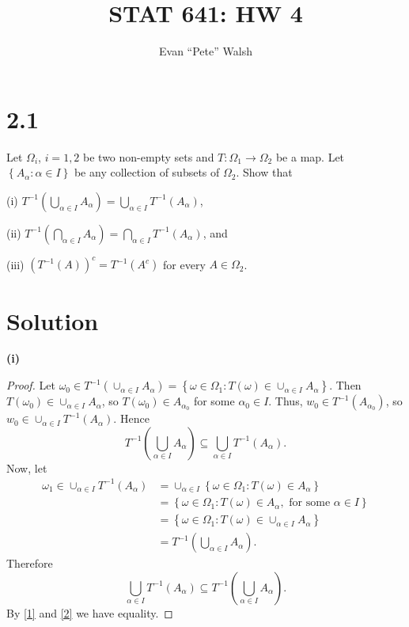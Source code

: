 \documentclass[12pt]{article}
\title{STAT 641: HW 4}
\author{Evan ``Pete'' Walsh}
\begin{document}
\maketitle

\section*{2.1}
Let $\Omega_{i}$, $i = 1,2$ be two non-empty sets and $T : \Omega_{1} \rightarrow \Omega_{2}$ be a map. Let $\left\{ A_{\alpha} : \alpha \in I
\right\}$ be any collection of subsets of $\Omega_{2}$. Show that

(i) $T^{-1}\left( \bigcup_{\alpha \in I}A_{\alpha} \right) = \bigcup_{\alpha\in I}T^{-1}(A_{\alpha})$,

(ii) $T^{-1}\left( \bigcap_{\alpha \in I} A_\alpha \right) = \bigcap_{\alpha \in I}T^{-1}(A_\alpha)$, and 

(iii) $\left( T^{-1}(A) \right)^{c} = T^{-1}(A^{c})$ for every $A \in \Omega_2$.

\section*{Solution}

{\bf (i)}
\begin{proof}
Let $\omega_0 \in T^{-1}(\cup_{\alpha \in I}A_{\alpha}) = \left\{ \omega \in \Omega_{1} : T(\omega) \in \cup_{\alpha \in I}A_{\alpha} \right\}$. Then
$T(\omega_0) \in \cup_{\alpha \in I}A_{\alpha}$, so $T(\omega_{0}) \in A_{\alpha_0}$ for some $\alpha_{0} \in I$. Thus, $w_0 \in T^{-1}(A_{\alpha_{0}})$, so
$w_{0} \in \cup_{\alpha \in I}T^{-1}(A_\alpha)$. Hence 
\begin{equation}
T^{-1}\left( \bigcup_{\alpha\in I}A_{\alpha} \right) \subseteq \bigcup_{\alpha\in I}T^{-1}(A_\alpha).
\label{1}
\end{equation}
Now, let 
\begin{align*}
\omega_{1} \in \cup_{\alpha \in I}T^{-1}(A_\alpha) & = \cup_{\alpha\in I}\left\{ \omega \in \Omega_{1} : T(\omega) \in A_\alpha \right\} \\
& = \left\{ \omega \in \Omega_{1} : T(\omega) \in A_{\alpha}, \text{ for some }\alpha \in I \right\} \\
& = \left\{ \omega \in \Omega_1 : T(\omega) \in \cup_{\alpha \in I}A_{\alpha} \right\} \\
& = T^{-1}\left( \bigcup_{\alpha \in I}A_{\alpha} \right).
\end{align*}
Therefore 
\begin{equation}
\bigcup_{\alpha \in I}T^{-1}(A_{\alpha}) \subseteq T^{-1}\left( \bigcup_{\alpha \in I}A_{\alpha} \right).
\label{2}
\end{equation}
By \ref{1} and \ref{2} we have equality.
\end{proof}
\end{document}
